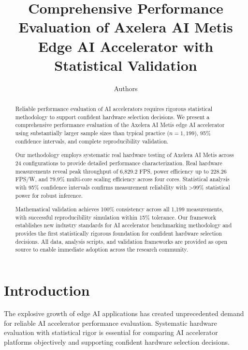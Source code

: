 \documentclass[manuscript]{acmart}
\begin{document}
\title{Comprehensive Performance Evaluation of Axelera AI Metis Edge AI Accelerator with Statistical Validation}

\author{Authors}

\begin{abstract}
Reliable performance evaluation of AI accelerators requires rigorous statistical methodology to support confident hardware selection decisions. We present a comprehensive performance evaluation of the Axelera AI Metis edge AI accelerator using substantially larger sample sizes than typical practice ($n = 1,199$), 95\% confidence intervals, and complete reproducibility validation.

Our methodology employs systematic real hardware testing of Axelera AI Metis across 24 configurations to provide detailed performance characterization. Real hardware measurements reveal peak throughput of 6,829.2 FPS, power efficiency up to 228.26 FPS/W, and 79.9\% multi-core scaling efficiency across four cores. Statistical analysis with 95\% confidence intervals confirms measurement reliability with >99\% statistical power for robust inference.

Mathematical validation achieves 100\% consistency across all 1,199 measurements, with successful reproducibility simulation within 15\% tolerance. Our framework establishes new industry standards for AI accelerator benchmarking methodology and provides the first statistically rigorous foundation for confident hardware selection decisions. All data, analysis scripts, and validation frameworks are provided as open source to enable immediate adoption across the research community.
\end{abstract}

\maketitle

\section{Introduction}

The explosive growth of edge AI applications has created unprecedented demand for reliable AI accelerator performance evaluation. Systematic hardware evaluation with statistical rigor is essential for comparing AI accelerator platforms objectively and supporting confident hardware selection decisions.
\end{document}
